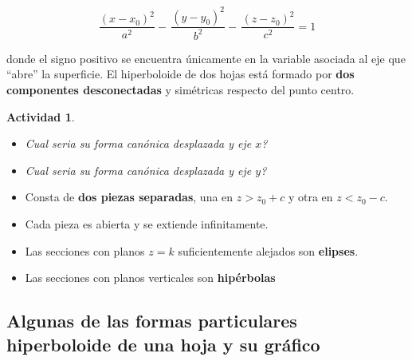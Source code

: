 \documentclass[11pt]{article}
\newtheorem{act}{Actividad}%
\begin{document}
\[
\frac{(x - x_0)^2}{a^2}
-\,\frac{(y - y_0)^2}{b^2}
-\,\frac{(z - z_0)^2}{c^2}
= 1 
\]

donde el signo positivo se encuentra únicamente en la variable asociada al eje que “abre” la superficie. El hiperboloide de dos hojas está formado por \textbf{dos componentes desconectadas} y simétricas respecto del punto centro.

\begin{act}
\begin{itemize} 
    \item Cual seria su forma canónica desplazada y  eje $x$?
    \item Cual seria su forma canónica desplazada y  eje $y$? 
\end{itemize}
\end{act}


\begin{itemize}
    \item Consta de \textbf{dos piezas separadas}, una en $z > z_0 + c$ y otra en $z < z_0 - c$.
    \item Cada pieza es abierta y se extiende infinitamente.
    \item Las secciones con planos $z = k$ suficientemente alejados son \textbf{elipses}.
    \item Las secciones con planos verticales son \textbf{hipérbolas}
\end{itemize}

\subsection*{Algunas de las formas particulares  hiperboloide de una hoja y su gráfico}
\end{document}
